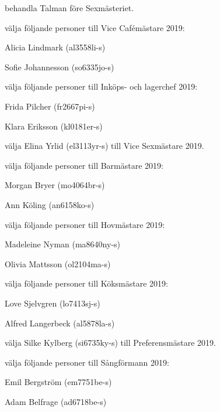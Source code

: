 \documentclass[10pt]{article}
\begin{document}
\begin{paragrafer}
\begin{paralist}
    
    \Mba behandla Talman före Sexmästeriet.

    \Mba välja följande personer till Vice Cafémästare 2019:
    \begin{tightdashlist}
        \item Alicia Lindmark (al3558li-s)
        \item Sofie Johannesson (so6335jo-s)
    \end{tightdashlist}

\newpage

    \Mba välja följande personer till Inköps- och lagerchef 2019:
    \begin{tightdashlist}
        \item Frida Pilcher (fr2667pi-s)
        \item Klara Eriksson (kl0181er-s)
    \end{tightdashlist}

    \Mba välja Elina Yrlid (el3113yr-s) till Vice Sexmästare 2019.

    \Mba välja följande personer till Barmästare 2019:
    \begin{tightdashlist}
        \item Morgan Bryer (mo4064br-s)
        \item Ann Köling (an6158ko-s)
    \end{tightdashlist}

    \Mba välja följande personer till Hovmästare 2019:
    \begin{tightdashlist}
        \item Madeleine Nyman (ma8640ny-s)
        \item Olivia Mattsson (ol2104ma-s)
    \end{tightdashlist}

    \Mba välja följande personer till Köksmästare 2019:
    \begin{tightdashlist}
        \item Love Sjelvgren (lo7413sj-s)
        \item Alfred Langerbeck (al5878la-s)
    \end{tightdashlist}

    \Mba välja Silke Kylberg (si6735ky-s) till Preferensmästare 2019.

    \Mba välja följande personer till Sångförmann 2019:
    \begin{tightdashlist}
        \item Emil Bergström (em7751be-s)
        \item Adam Belfrage (ad6718be-s)
    \end{tightdashlist}


\end{paralist}
\end{paragrafer}
\end{document}
